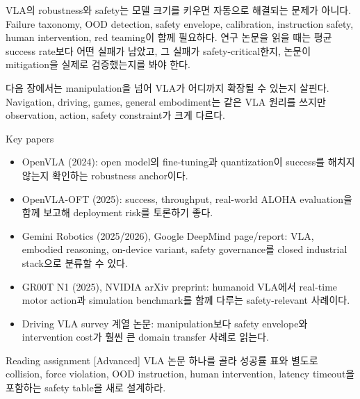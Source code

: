 VLA의 robustness와 safety는 모델 크기를 키우면 자동으로 해결되는 문제가 아니다. Failure taxonomy, OOD detection, safety envelope, calibration, instruction safety, human intervention, red teaming이 함께 필요하다. 연구 논문을 읽을 때는 평균 success rate보다 어떤 실패가 남았고, 그 실패가 safety-critical한지, 논문이 mitigation을 실제로 검증했는지를 봐야 한다.

다음 장에서는 manipulation을 넘어 VLA가 어디까지 확장될 수 있는지 살핀다. Navigation, driving, games, general embodiment는 같은 VLA 원리를 쓰지만 observation, action, safety constraint가 크게 다르다.

\begin{sourcebox}{Key papers}
\begin{itemize}
  \item OpenVLA (2024): open model의 fine-tuning과 quantization이 success를 해치지 않는지 확인하는 robustness anchor이다.
  \item OpenVLA-OFT (2025): success, throughput, real-world ALOHA evaluation을 함께 보고해 deployment risk를 토론하기 좋다.
  \item Gemini Robotics (2025/2026), Google DeepMind page/report: VLA, embodied reasoning, on-device variant, safety governance를 closed industrial stack으로 분류할 수 있다.
  \item GR00T N1 (2025), NVIDIA arXiv preprint: humanoid VLA에서 real-time motor action과 simulation benchmark를 함께 다루는 safety-relevant 사례이다.
  \item Driving VLA survey 계열 논문: manipulation보다 safety envelope와 intervention cost가 훨씬 큰 domain transfer 사례로 읽는다.
\end{itemize}
\end{sourcebox}

\begin{assignmentbox}{Reading assignment [Advanced]}
VLA 논문 하나를 골라 성공률 표와 별도로 collision, force violation, OOD instruction, human intervention, latency timeout을 포함하는 safety table을 새로 설계하라.
\end{assignmentbox}
